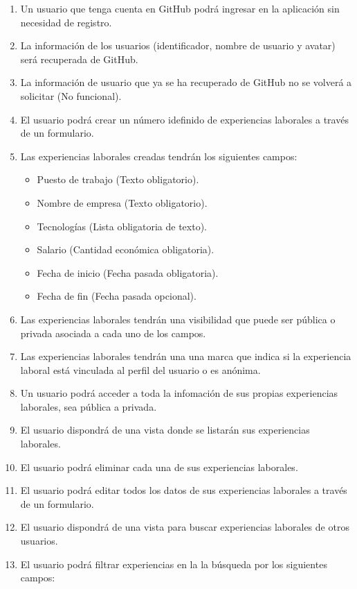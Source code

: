 \documentclass[a4paper, 12pt]{book}
\begin{document}
    \begin{enumerate}
        \item Un usuario que tenga cuenta en GitHub podrá ingresar en la aplicación sin necesidad de registro.
        \item La información de los usuarios (identificador, nombre de usuario y avatar) será recuperada de GitHub.
        \item La información de usuario que ya se ha recuperado de GitHub no se volverá a solicitar (No funcional).
        \item El usuario podrá crear un número idefinido de experiencias laborales a través de un formulario.
        \item Las experiencias laborales creadas tendrán los siguientes campos:
        \begin{itemize}
            \item Puesto de trabajo (Texto obligatorio).
            \item Nombre de empresa (Texto obligatorio).
            \item Tecnologías (Lista obligatoria de texto).
            \item Salario (Cantidad económica obligatoria).
            \item Fecha de inicio (Fecha pasada obligatoria).
            \item Fecha de fin (Fecha pasada opcional).
        \end{itemize}
        \item Las experiencias laborales tendrán una visibilidad que puede ser pública o privada asociada a cada uno de los campos.
        \item Las experiencias laborales tendrán una una marca que indica si la experiencia laboral está vinculada al perfil del usuario o es anónima.
        \item Un usuario podrá acceder a toda la infomación de sus propias experiencias laborales, sea pública a privada.
        \item El usuario dispondrá de una vista donde se listarán sus experiencias laborales.
        \item El usuario podrá eliminar cada una de sus experiencias laborales.
        \item El usuario podrá editar todos los datos de sus experiencias laborales a través de un formulario.
        \item El usuario dispondrá de una vista para buscar experiencias laborales de otros usuarios.
        \item El usuario podrá filtrar experiencias en la la búsqueda por los siguientes campos:

\end{enumerate}
\end{document}
